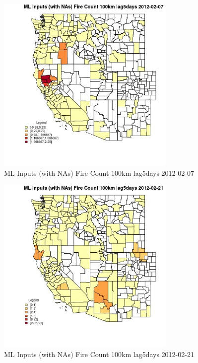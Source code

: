 \begin{figure} 
\centering  
\includegraphics[width=0.77\textwidth]{Code_Outputs/Report_ML_input_PM25_Step4_part_f_de_duplicated_aveswNAs_CountyFire_Count_100km_lag5daysMean2012-02-07.jpg} 
\caption{\label{fig:Report_ML_input_PM25_Step4_part_f_de_duplicated_aveswNAsCountyFire_Count_100km_lag5daysMean2012-02-07}ML Inputs (with NAs) Fire Count 100km lag5days 2012-02-07} 
\end{figure} 
 

\begin{figure} 
\centering  
\includegraphics[width=0.77\textwidth]{Code_Outputs/Report_ML_input_PM25_Step4_part_f_de_duplicated_aveswNAs_CountyFire_Count_100km_lag5daysMean2012-02-21.jpg} 
\caption{\label{fig:Report_ML_input_PM25_Step4_part_f_de_duplicated_aveswNAsCountyFire_Count_100km_lag5daysMean2012-02-21}ML Inputs (with NAs) Fire Count 100km lag5days 2012-02-21} 
\end{figure} 
 

